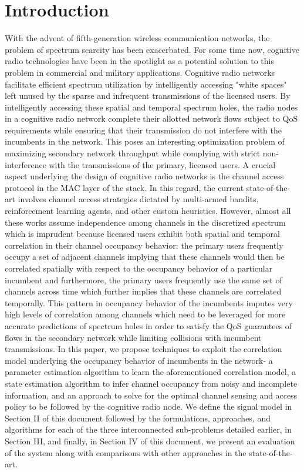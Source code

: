 \documentclass[10pt,twocolumn]{IEEEtran}
\newcommand{\bk}[1]{{\color{magenta}{[BK: #1]}}}
\begin{document}
\section{Introduction}\label{I}
With the advent of fifth-generation wireless communication networks, the problem of spectrum scarcity has been exacerbated. For some time now, cognitive radio technologies have been in the spotlight as a potential solution to this problem in commercial and military applications. Cognitive radio networks facilitate efficient spectrum utilization by intelligently accessing "white spaces" left unused by the sparse and infrequent transmissions of the licensed users. By intelligently accessing these spatial and temporal spectrum holes, the radio nodes in a cognitive radio network complete their allotted network flows subject to QoS requirements while ensuring that their transmission do not interfere with the incumbents in the network. This poses an interesting optimization problem of maximizing secondary network throughput while complying with strict non-interference with the transmissions of the primary, licensed users. A crucial aspect underlying the design of cognitive radio networks is the channel access protocol in the MAC layer of the stack. In this regard, the current state-of-the-art involves channel access strategies dictated by multi-armed bandits, reinforcement learning agents, and other custom heuristics. However, almost all these works assume independence among channels in the discretized spectrum which is imprudent because licensed users exhibit both spatial and temporal correlation in their channel occupancy behavior: the primary users frequently occupy a set of adjacent channels implying that these channels would then be correlated spatially with respect to the occupancy behavior of a particular incumbent and furthermore, the primary users frequently use the same set of channels across time which further implies that these channels are correlated temporally. This pattern in occupancy behavior of the incumbents imputes very high levels of correlation among channels which need to be leveraged for more accurate predictions of spectrum holes in order to satisfy the QoS guarantees of flows in the secondary network while limiting collisions with incumbent transmissions. In this paper, we propose techniques to exploit the correlation model underlying the occupancy behavior of incumbents in the network- a parameter estimation algorithm to learn the aforementioned correlation model, a state estimation algorithm to infer channel occupancy from noisy and incomplete information, and an approach to solve for the optimal channel sensing and access policy to be followed by the cognitive radio node. We define the signal model in Section II of this document followed by the formulations, approaches, and algorithms for each of the three interconnected sub-problems detailed earlier, in Section III, and finally, in Section IV of this document, we present an evaluation of the system along with comparisons with other approaches in the state-of-the-art.
\\\bk{Include a brief description of the approaches in a few papers in the state-of-the-art: the correlation coefficient based paper, restless MABs, and SARSA}
\end{document}
